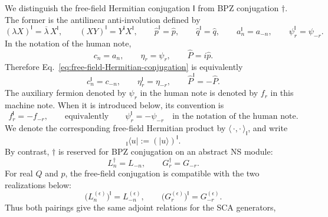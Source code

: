 \documentclass[11pt]{article}
\newcommand{\Ibra}[1]{{}_{\mathsf I}\!\langle #1|}
\begin{document}
We distinguish the free-field Hermitian conjugation \(\mathsf I\) from
BPZ conjugation \(\dagger\).  The former is the antilinear
anti-involution defined by
\begin{equation}
 (\lambda X)^{\mathsf I}
 =\overline{\lambda}\,X^{\mathsf I},
 \qquad
 (XY)^{\mathsf I}=Y^{\mathsf I}X^{\mathsf I},
 \qquad
 \widehat p^{\mathsf I}=\widehat p,
 \qquad
 \widehat q^{\mathsf I}=\widehat q,
 \qquad
 a_n^{\mathsf I}=a_{-n},
 \qquad
 \psi_r^{\mathsf I}=\psi_{-r}.
 \label{eq:free-field-Hermitian-conjugation}
\end{equation}
In the notation of the human note,
\begin{equation}
 c_n=a_n,
 \qquad
 \eta_r=\psi_r,
 \qquad
 \widehat P=i\widehat p.
 \label{eq:human-note-free-field-dictionary}
\end{equation}
Therefore Eq.~\eqref{eq:free-field-Hermitian-conjugation} is equivalently
\begin{equation}
 c_n^{\mathsf I}=c_{-n},
 \qquad
 \eta_r^{\mathsf I}=\eta_{-r},
 \qquad
 \widehat P^{\mathsf I}=-\widehat P.
 \label{eq:I-rules-human-note-notation}
\end{equation}
The auxiliary fermion denoted by \(\psi_r\) in the human note is denoted by
\(f_r\) in this machine note.  When it is introduced below, its convention
is
\begin{equation}
 f_r^{\mathsf I}=-f_{-r},
 \qquad\text{equivalently}\qquad
 \psi_r^{\mathsf I}=-\psi_{-r}
 \quad\text{in the notation of the human note}.
 \label{eq:auxiliary-I-rule-human-note-notation}
\end{equation}
We denote the corresponding free-field Hermitian product by
\(\langle\,\cdot,\cdot\,\rangle_{\mathsf I}\), and write
\begin{equation}
 \Ibra{u}:=(|u\rangle)^{\mathsf I}.
 \label{eq:I-bra-definition}
\end{equation}
By contrast, \(\dagger\) is reserved for BPZ conjugation on an abstract
NS module:
\begin{equation}
 L_n^\dagger=L_{-n},
 \qquad
 G_r^\dagger=G_{-r}.
 \label{eq:BPZ-conjugation}
\end{equation}
For real \(Q\) and \(p\), the free-field conjugation is compatible with
the two realizations below:
\begin{equation}
 \bigl(L_n^{(\epsilon)}\bigr)^{\mathsf I}
 =L_{-n}^{(\epsilon)},
 \qquad
 \bigl(G_r^{(\epsilon)}\bigr)^{\mathsf I}
 =G_{-r}^{(\epsilon)}.
 \label{eq:I-compatible-with-SCA}
\end{equation}
Thus both pairings give the same adjoint relations for the SCA generators,
\end{document}
